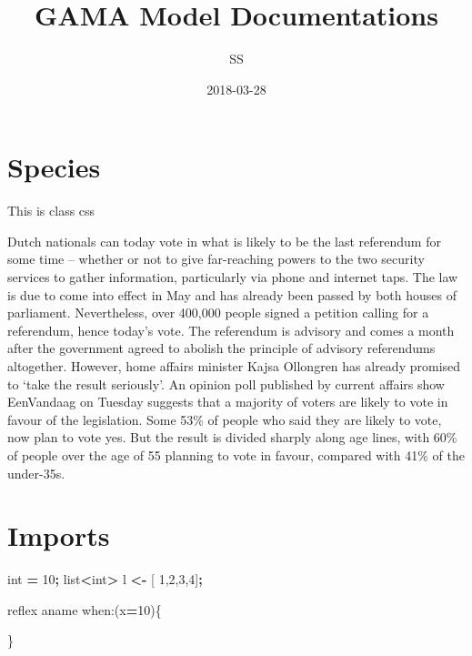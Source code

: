 \documentclass[]{book}
\title{GAMA Model Documentations}
\author{SS}
\date{2018-03-28}
\newenvironment{Shaded}{\begin{snugshade}}{\end{snugshade}}
\newcommand{\BuiltInTok}[1]{#1}
\newcommand{\DecValTok}[1]{\textcolor[rgb]{0.00,0.00,0.81}{#1}}
\newcommand{\NormalTok}[1]{#1}
\newcommand{\OperatorTok}[1]{\textcolor[rgb]{0.81,0.36,0.00}{\textbf{#1}}}
\begin{document}
\maketitle

{
\setcounter{tocdepth}{1}
\tableofcontents
}
\hypertarget{species}{%
\chapter{Species}\label{species}}

 This is class css

Dutch nationals can today vote in what is likely to be the last
referendum for some time -- whether or not to give far-reaching powers
to the two security services to gather information, particularly via
phone and internet taps. The law is due to come into effect in May and
has already been passed by both houses of parliament. Nevertheless, over
400,000 people signed a petition calling for a referendum, hence today's
vote. The referendum is advisory and comes a month after the government
agreed to abolish the principle of advisory referendums altogether.
However, home affairs minister Kajsa Ollongren has already promised to
`take the result seriously'. An opinion poll published by current
affairs show EenVandaag on Tuesday suggests that a majority of voters
are likely to vote in favour of the legislation. Some 53\% of people who
said they are likely to vote, now plan to vote yes. But the result is
divided sharply along age lines, with 60\% of people over the age of 55
planning to vote in favour, compared with 41\% of the under-35s.

\hypertarget{imports}{%
\chapter{Imports}\label{imports}}

\begin{Shaded}
\begin{Highlighting}[]
\BuiltInTok{int} \OperatorTok{=} \DecValTok{10}\OperatorTok{;}
\BuiltInTok{list}\OperatorTok{<}\BuiltInTok{int}\OperatorTok{>}\NormalTok{ l }\OperatorTok{<-}\NormalTok{ [ }\DecValTok{1}\NormalTok{,}\DecValTok{2}\NormalTok{,}\DecValTok{3}\NormalTok{,}\DecValTok{4}\NormalTok{]}\OperatorTok{;}

\NormalTok{reflex aname when:(x}\OperatorTok{=}\DecValTok{10}\NormalTok{)\{}

\NormalTok{\}}
\end{Highlighting}
\end{Shaded}
\end{document}
